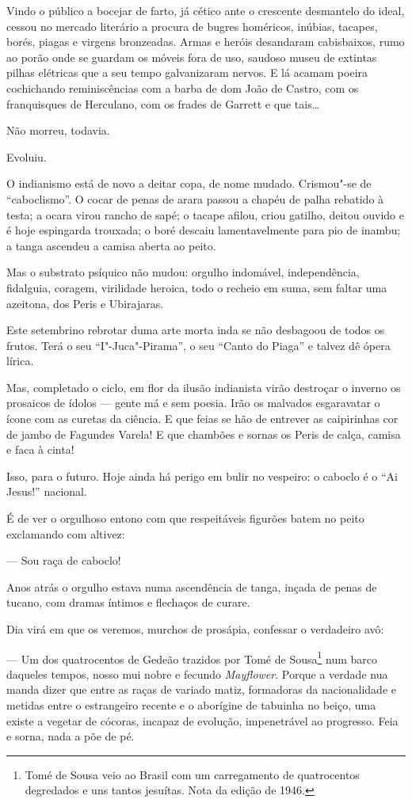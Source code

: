 Vindo o público a bocejar de farto, já cético ante o crescente
desmantelo do ideal, cessou no mercado literário a procura de bugres
homéricos, inúbias, tacapes, borés, piagas e virgens bronzeadas. Armas e
heróis desandaram cabisbaixos, rumo ao porão onde se guardam os móveis
fora de uso, saudoso museu de extintas pilhas elétricas que a seu tempo
galvanizaram nervos. E lá acamam poeira cochichando reminiscências com a
barba de dom João de Castro, com os franquisques de Herculano, com os
frades de Garrett e que tais\ldots{}

Não morreu, todavia.

Evoluiu.

O indianismo está de novo a deitar copa, de nome mudado. Crismou"-se de
``caboclismo''. O cocar de penas de arara passou a chapéu de palha
rebatido à testa; a ocara virou rancho de sapé; o tacape afilou, criou
gatilho, deitou ouvido e é hoje espingarda trouxada; o boré descaiu
lamentavelmente para pio de inambu; a tanga ascendeu a camisa aberta ao
peito.

Mas o substrato psíquico não mudou: orgulho indomável, independência,
fidalguia, coragem, virilidade heroica, todo o recheio em suma, sem
faltar uma azeitona, dos Peris e Ubirajaras.

Este setembrino rebrotar duma arte morta inda se não desbagoou de todos
os frutos. Terá o seu ``I"-Juca"-Pirama'', o seu ``Canto do Piaga'' e
talvez dê ópera lírica.

Mas, completado o ciclo, em flor da ilusão indianista virão destroçar o
inverno os prosaicos de ídolos --- gente má e sem poesia. Irão os
malvados esgaravatar o ícone com as curetas da ciência. E que feias se
hão de entrever as caipirinhas cor de jambo de Fagundes Varela! E que
chambões e sornas os Peris de calça, camisa e faca à cinta!

Isso, para o futuro. Hoje ainda há perigo em bulir no vespeiro: o
caboclo é o ``Ai Jesus!'' nacional.

É de ver o orgulhoso entono com que respeitáveis figurões batem no peito
exclamando com altivez:

--- Sou raça de caboclo!

Anos atrás o orgulho estava numa ascendência de tanga, inçada de penas
de tucano, com dramas íntimos e flechaços de curare.

Dia virá em que os veremos, murchos de prosápia, confessar o verdadeiro
avô:

--- Um dos quatrocentos de Gedeão trazidos por Tomé de Sousa\footnote{Tomé
  de Sousa veio ao Brasil com um carregamento de quatrocentos degredados
  e uns tantos jesuítas. Nota da edição de 1946.} num barco daqueles
tempos, nosso mui nobre e fecundo \emph{Mayflower}. Porque a verdade nua
manda dizer que entre as raças de variado matiz, formadoras da
nacionalidade e metidas entre o estrangeiro recente e o aborígine de
tabuinha no beiço, uma existe a vegetar de cócoras, incapaz de evolução,
impenetrável ao progresso. Feia e sorna, nada a põe de pé.

